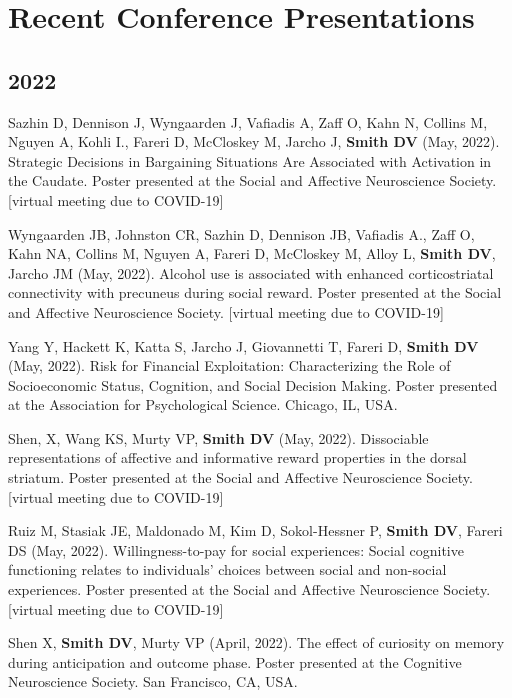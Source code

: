 \documentclass[11pt, letterpaper]{article}
\begin{document}
\section*{Recent Conference Presentations}
\label{sec:conferences}

\subsection*{2022}
\begin{hangparas}{.5in}{1}

Sazhin D, Dennison J, Wyngaarden J, Vafiadis A, Zaff O, Kahn N, Collins M, Nguyen A, Kohli I., Fareri D, McCloskey M, Jarcho J, \textbf{Smith DV} (May, 2022). Strategic Decisions in Bargaining Situations Are Associated with Activation in the Caudate. Poster presented at the Social and Affective Neuroscience Society. [virtual meeting due to COVID-19]

Wyngaarden JB, Johnston CR, Sazhin D, Dennison JB, Vafiadis A., Zaff O, Kahn NA, Collins M, Nguyen A, Fareri D, McCloskey M, Alloy L, \textbf{Smith DV}, Jarcho JM (May, 2022). Alcohol use is associated with enhanced corticostriatal connectivity with precuneus during social reward. Poster presented at the Social and Affective Neuroscience Society. [virtual meeting due to COVID-19]

Yang Y, Hackett K, Katta S, Jarcho J, Giovannetti T, Fareri D, \textbf{Smith DV} (May, 2022). Risk for Financial Exploitation: Characterizing the Role of Socioeconomic Status, Cognition, and Social Decision Making. Poster presented at the Association for Psychological Science. Chicago, IL, USA.

Shen, X, Wang KS, Murty VP, \textbf{Smith DV} (May, 2022). Dissociable representations of affective and informative reward properties in the dorsal striatum. Poster presented at the Social and Affective Neuroscience Society. [virtual meeting due to COVID-19]

Ruiz M, Stasiak JE, Maldonado M, Kim D, Sokol-Hessner P, \textbf{Smith DV}, Fareri DS (May, 2022). Willingness-to-pay for social experiences: Social cognitive functioning relates to individuals' choices between social and non-social experiences. Poster presented at the Social and Affective Neuroscience Society. [virtual meeting due to COVID-19]

Shen X, \textbf{Smith DV}, Murty VP (April, 2022). The effect of curiosity on memory during anticipation and outcome phase. Poster presented at the Cognitive Neuroscience Society. San Francisco, CA, USA.

\end{hangparas}
\end{document}
